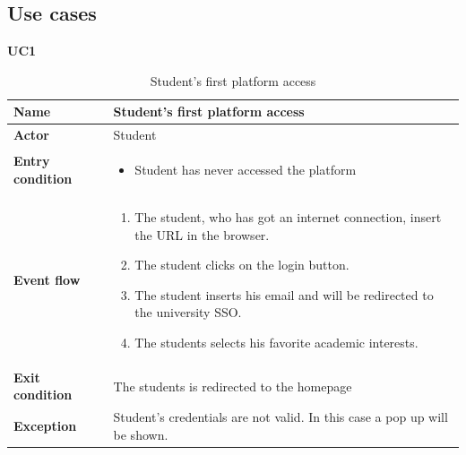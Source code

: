 \pagebreak
\subsection{Use cases}

    \textbf{UC1}
    \nopagebreak
    \begin{table}[H]
    \centering
    \begin{tabular}{|l|p{11.9cm}|}
        \hline
        \textbf{Name}            & Student's first platform access                     \\\hline
        \textbf{Actor}           & Student         \\\hline
        \textbf{Entry condition} &
        \begin{itemize}
              \item Student has never accessed the platform
        \end{itemize}                                        \\\hline
        \textbf{Event flow}      &
        \begin{enumerate}[label=\arabic*.]
              \item The student, who has got an internet connection, insert the URL in the browser.
              \item The student clicks on the login button.
              \item The student inserts his email and will be redirected to the university SSO.
              \item The students selects his favorite academic interests.
        \end{enumerate}            \\\hline
        \textbf{Exit condition}  & The students is redirected to the homepage\\\hline
        \textbf{Exception}       &  Student's credentials are not valid. In this case a pop up will be shown.   \\\hline
    \end{tabular}
    \caption{Student's first platform access}
    \label{table:Student's first platform access}
    \end{table}

